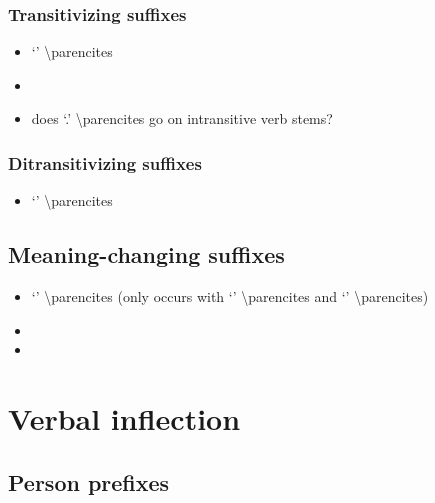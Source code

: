 \documentclass{memoir}
\begin{document}
\subsection{Transitivizing suffixes}

\begin{itemize}
\tightlist
\item
   `' \textbackslash parencites
\item
\item
  does  `.' \textbackslash parencites go on
  intransitive verb stems?
\end{itemize}

\subsection{\texorpdfstring{Ditransitivizing suffixes
\label{sec:ditrz}}{Ditransitivizing suffixes }}

\begin{itemize}
\tightlist
\item
   `' \textbackslash parencites
\end{itemize}

\section{\texorpdfstring{Meaning-changing suffixes
\label{sec:meaningderiv}}{Meaning-changing suffixes }}

\begin{itemize}
\item
   `' \textbackslash parencites (only occurs with
   `' \textbackslash parencites and 
  `' \textbackslash parencites)
\item
\item
\end{itemize}

\chapter{\texorpdfstring{Verbal inflection
\label{verbinfl}}{Verbal inflection }}

\section{\texorpdfstring{Person prefixes
\label{sec:verbperson}}{Person prefixes }}
\end{document}

